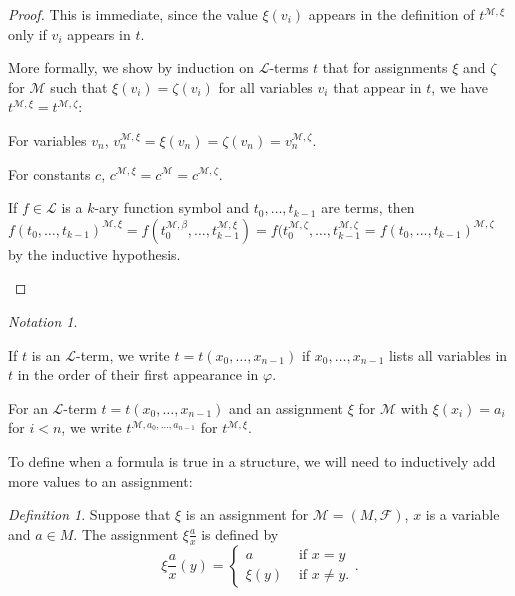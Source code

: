 \documentclass[a4paper, 11pt]{amsart}
\theoremstyle{remark}
\newtheorem{notation}[theorem]{Notation}
\newtheorem{definition}[definition]{Definition}
\newcommand{\cF}{\mathcal F}
\newcommand{\cL}{\mathcal L}
\newcommand{\cM}{\mathcal M}
\newenvironment{enumerate-(1)}{\begin{enumerate}[label={\upshape (\arabic*)}, leftmargin=2pc]}{\end{enumerate}}
\begin{document}
\begin{proof} 
This is immediate, since the value $\xi(v_i)$ appears in the definition of $t^{\cM,\xi}$ only if $v_i$ appears in $t$. 

More formally, we show by induction on $\cL$-terms $t$ that for assignments $\xi$ and $\zeta$ for $\cM$ such that $\xi(v_i)=\zeta(v_i)$ for all variables $v_i$ that appear in $t$, we have $t^{\cM,\xi}=t^{\cM,\zeta}$: 
\begin{enumerate-(1)} 
\item 
For variables $v_n$, $v_n^{\cM,\xi}=\xi(v_n)=\zeta(v_n)=v_n^{\cM,\zeta}$. 
\item 
For constants $c$,  $c^{\cM,\xi}=c^{\cM}=c^{\cM,\zeta}$. 
\item 
If $f\in \cL$ is a $k$-ary function symbol and $t_0,\dots,t_{k-1}$ are terms, then   $f(t_0,\dots,t_{k-1})^{\cM,\xi}=f(t_0^{\cM,\beta},\dots,t_{k-1}^{\cM,\xi})=f(t_0^{\cM,\zeta},\dots,t_{k-1}^{\cM,\zeta}=f(t_0,\dots,t_{k-1})^{\cM,\zeta}$ by the inductive hypothesis. 
\end{enumerate-(1)} 
\end{proof} 

\begin{notation} \ 
\label{notation terms with free variables} 
\begin{enumerate-(1)} 
\item 
If $t$ is an $\cL$-term, we write $t=t(x_0,\dots,x_{n-1})$ if $x_0,\dots,x_{n-1}$ lists all variables in $t$ in the order of their first appearance in $\varphi$. 
\item 
For an $\cL$-term $t=t(x_0,\dots,x_{n-1})$ and an assignment $\xi$ for $\cM$ with $\xi(x_i)=a_i$ for $i<n$, we write $t^{\cM,a_0,\dots,a_{n-1}}$ for $t^{\cM,\xi}$. 
\end{enumerate-(1)} 
\end{notation} 

To define when a formula is true in a structure, we will need to inductively add more values to an assignment: 

\begin{definition} 
Suppose that $\xi$ is an assignment for $\cM=(M,\cF)$, $x$ is a variable and $a\in M$. 
The assignment $\xi \frac{a}{x}$ is defined by 
$$ \xi \frac{a}{x}(y) = \begin{cases}
      a & \text{ if }  x=y \\
      \xi(y) & \text{ if }  x\neq y.  
    \end{cases} .$$ 
\end{definition} 
\end{document}
